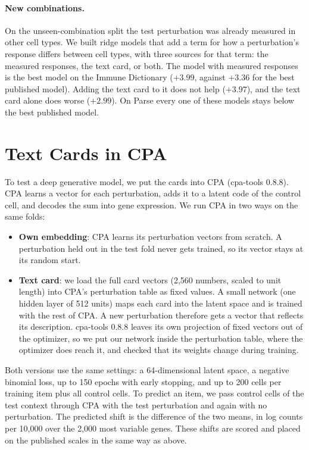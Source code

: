 \documentclass[]{style}
\begin{document}
\paragraph{New combinations.} On the unseen-combination split the test perturbation was already measured in other cell
types. We built ridge models that add a term for how a perturbation's response differs between cell types, with three
sources for that term: the measured responses, the text card, or both. The model with measured responses is the best
model on the Immune Dictionary ($+3.99$, against $+3.36$ for the best published model). Adding the text card to it does
not help ($+3.97$), and the text card alone does worse ($+2.99$). On Parse every one of these models stays below the best
published model.

\section{Text Cards in CPA}

To test a deep generative model, we put the cards into CPA \citep{cpa} (cpa-tools 0.8.8).
CPA learns a vector for each perturbation, adds it to a latent code of the control cell, and decodes the sum into gene
expression. We run CPA in two ways on the same folds:

\begin{itemize}[leftmargin=*,itemsep=1pt,topsep=2pt]
\item \textbf{Own embedding}: CPA learns its perturbation vectors from scratch. A perturbation held out in the test fold
never gets trained, so its vector stays at its random start.
\item \textbf{Text card}: we load the full card vectors (2,560 numbers, scaled to unit length) into CPA's
perturbation table as fixed values. A small network (one hidden layer of 512 units) maps each card into the latent
space and is trained with the rest of CPA. A new perturbation therefore gets a vector that reflects its description.
cpa-tools 0.8.8 leaves its own projection of fixed vectors out of the optimizer, so we put our network inside the
perturbation table, where the optimizer does reach it, and checked that its weights change during training.
\end{itemize}

Both versions use the same settings: a 64-dimensional latent space, a negative binomial loss, up to 150 epochs with
early stopping, and up to 200 cells per training item plus all control cells. To predict an item, we pass control cells of the test context through CPA with the test perturbation and
again with no perturbation. The predicted shift is the difference of the two means, in log counts per 10,000 over the
2,000 most variable genes. These shifts are scored and placed on the published scales in the same way as above.
\end{document}
